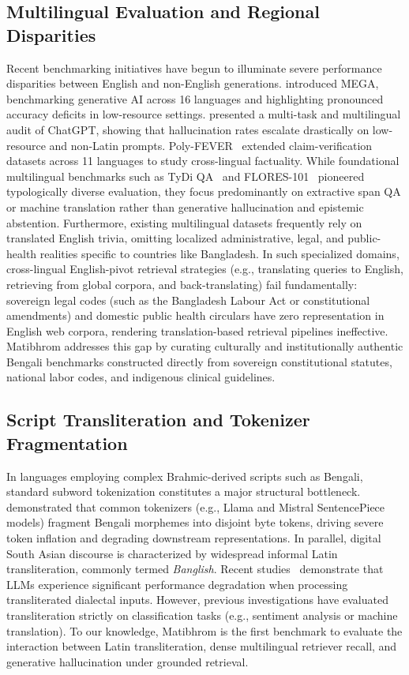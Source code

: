 \documentclass[11pt,a4paper,twocolumn]{article}
\begin{document}
\subsection{Multilingual Evaluation and Regional Disparities}
Recent benchmarking initiatives have begun to illuminate severe performance disparities between English and non-English generations. \citet{ahuja2023mega} introduced MEGA, benchmarking generative AI across 16 languages and highlighting pronounced accuracy deficits in low-resource settings. \citet{bang2023multitask} presented a multi-task and multilingual audit of ChatGPT, showing that hallucination rates escalate drastically on low-resource and non-Latin prompts. Poly-FEVER~\citep{zhu2024polyfever} extended claim-verification datasets across 11 languages to study cross-lingual factuality. While foundational multilingual benchmarks such as TyDi QA~\citep{clark2020tydi} and FLORES-101~\citep{goyal2022flores} pioneered typologically diverse evaluation, they focus predominantly on extractive span QA or machine translation rather than generative hallucination and epistemic abstention. Furthermore, existing multilingual datasets frequently rely on translated English trivia, omitting localized administrative, legal, and public-health realities specific to countries like Bangladesh. In such specialized domains, cross-lingual English-pivot retrieval strategies (e.g., translating queries to English, retrieving from global corpora, and back-translating) fail fundamentally: sovereign legal codes (such as the Bangladesh Labour Act or constitutional amendments) and domestic public health circulars have zero representation in English web corpora, rendering translation-based retrieval pipelines ineffective. Matibhrom addresses this gap by curating culturally and institutionally authentic Bengali benchmarks constructed directly from sovereign constitutional statutes, national labor codes, and indigenous clinical guidelines.

\subsection{Script Transliteration and Tokenizer Fragmentation}
In languages employing complex Brahmic-derived scripts such as Bengali, standard subword tokenization constitutes a major structural bottleneck. \citet{hasan2023banglatokenizer} demonstrated that common tokenizers (e.g., Llama and Mistral SentencePiece models) fragment Bengali morphemes into disjoint byte tokens, driving severe token inflation and degrading downstream representations. In parallel, digital South Asian discourse is characterized by widespread informal Latin transliteration, commonly termed \emph{Banglish}. Recent studies~\citep{saha2024robustness,chowdhury20245dialects} demonstrate that LLMs experience significant performance degradation when processing transliterated dialectal inputs. However, previous investigations have evaluated transliteration strictly on classification tasks (e.g., sentiment analysis or machine translation). To our knowledge, Matibhrom is the first benchmark to evaluate the interaction between Latin transliteration, dense multilingual retriever recall, and generative hallucination under grounded retrieval.
\end{document}

